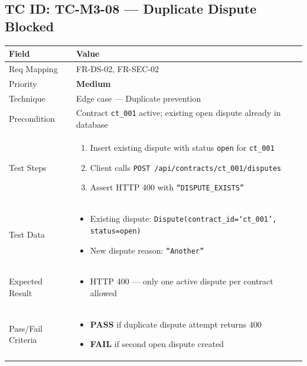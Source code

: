 \documentclass[12pt,a4paper]{article}
\newcommand{\sevmed}{\textcolor{severitymed}{\textbf{Medium}}}
\newcommand{\passresult}{\textcolor{passgreen}{\textbf{PASS}}}
\newcommand{\failresult}{\textcolor{failred}{\textbf{FAIL}}}
\begin{document}
\vspace{0.8cm}

\subsection{TC ID: TC-M3-08 --- Duplicate Dispute Blocked}

\begin{tabular}{|p{}|p{}|}
\hline
\rowcolor{lightblue} \textbf{Field} & \textbf{Value} \\
\hline
Req Mapping & FR-DS-02, FR-SEC-02 \\
\hline
Priority & \sevmed \\
\hline
Technique & Edge case --- Duplicate prevention \\
\hline
Precondition & Contract \texttt{ct\_001} active; existing open dispute already in database \\
\hline
Test Steps &
\begin{enumerate}[nosep, leftmargin=*]
  \item Insert existing dispute with status \texttt{open} for \texttt{ct\_001}
  \item Client calls \texttt{POST /api/contracts/ct\_001/disputes}
  \item Assert HTTP 400 with \texttt{``DISPUTE\_EXISTS''}
\end{enumerate} \\
\hline
Test Data &
\begin{itemize}[nosep, leftmargin=*]
  \item Existing dispute: \texttt{Dispute(contract\_id=`ct\_001', status=open)}
  \item New dispute reason: \texttt{``Another''}
\end{itemize} \\
\hline
Expected Result &
\begin{itemize}[nosep, leftmargin=*]
  \item HTTP 400 --- only one active dispute per contract allowed
\end{itemize} \\
\hline
Pass/Fail Criteria &
\begin{itemize}[nosep, leftmargin=*]
  \item \passresult{} if duplicate dispute attempt returns 400
  \item \failresult{} if second open dispute created
\end{itemize} \\
\hline
\end{tabular}
\end{document}
